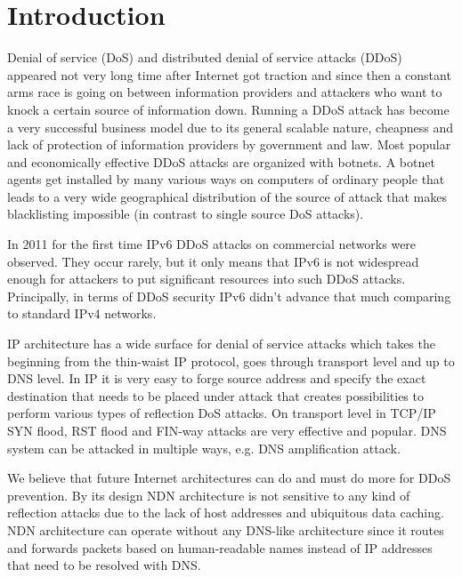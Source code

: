 \section{Introduction}
\label{sec:intro}


Denial of service (DoS) and distributed denial of service attacks (DDoS) appeared not very long time after Internet got traction and since then a constant arms race is going on between information providers and attackers who want to knock a certain source of information down. Running a DDoS attack has become a very successful business model due to its general scalable nature, cheapness and lack of protection of information providers by government and law. Most popular and economically effective DDoS attacks are organized with botnets. A botnet agents get installed by many various ways on computers of ordinary people that leads to a very wide geographical distribution of the source of attack that makes blacklisting impossible (in contrast to single source DoS attacks).

In 2011 for the first time IPv6 DDoS attacks on commercial networks were observed. They occur rarely, but it only means that IPv6 is not widespread enough for attackers to put significant resources into such DDoS attacks. Principally, in terms of DDoS security IPv6 didn't advance that much comparing to standard IPv4 networks.

IP architecture has a wide surface for denial of service attacks which takes the beginning from the thin-waist IP protocol, goes through transport level and up to DNS level. In IP it is very easy to forge source address and specify the exact destination that needs to be placed under attack that creates possibilities to perform various types of reflection DoS attacks. On transport level in TCP/IP SYN flood, RST flood and FIN-way attacks are very effective and popular. DNS system can be attacked in multiple ways, e.g. DNS amplification attack. 

We believe that future Internet architectures can do and must do more for DDoS prevention. By its design NDN architecture is not sensitive to any kind of reflection attacks due to the lack of host addresses and ubiquitous data caching. NDN architecture can operate without any DNS-like architecture since it routes and forwards packets based on human-readable names instead of IP addresses that need to be resolved with DNS. 
  
